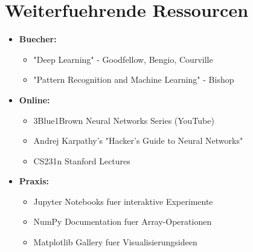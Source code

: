 ﻿\documentclass[12pt,a4paper]{article}
\begin{document}
\section*{Weiterfuehrende Ressourcen}
\begin{itemize}
    \item \textbf{Buecher:} 
    \begin{itemize}
        \item "Deep Learning" - Goodfellow, Bengio, Courville
        \item "Pattern Recognition and Machine Learning" - Bishop
    \end{itemize}
    \item \textbf{Online:}
    \begin{itemize}
        \item 3Blue1Brown Neural Networks Series (YouTube)
        \item Andrej Karpathy's "Hacker's Guide to Neural Networks"
        \item CS231n Stanford Lectures
    \end{itemize}
    \item \textbf{Praxis:}
    \begin{itemize}
        \item Jupyter Notebooks fuer interaktive Experimente
        \item NumPy Documentation fuer Array-Operationen
        \item Matplotlib Gallery fuer Visualisierungsideen
    \end{itemize}
\end{itemize}
\end{document}
